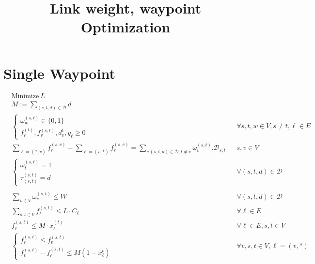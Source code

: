 \documentclass[a4paper,USenglish]{lipics-v2018}
\title{Link weight, waypoint Optimization}
\begin{document}
\maketitle

\section{Single Waypoint}

\begin{align}
& \text{Minimize} ~L \nonumber	&&\\
&M := \sum_{ (s,t,d) \in \mathcal{D}} d &&
\\
&\begin{cases}
\omega^{(s,t)}_{w} \in \{0,1\} \\
f^{(t)}_{\ell}, f^{(s,t)}_{v}, d^{t}_v, y_{\ell}  \geq 0
\end{cases}
&&\forall  s,t,w \in V, s \neq t, \ell \in E \label{LP:vardef}    
\\
&\sum_{\ell = (*,v)} f^{(s,v)}_{\ell} - 
	\sum_{\ell= (v,*)}f^{(s,v)}_{\ell}
	=  \sum_{ \forall (s,t,d) \in \mathcal{D}, t\neq v} \omega^{(s,t)}_{v}.\mathcal{D}_{s,t}
&& s,v \in V
\label{LP:flowcons}
\\
& 
\begin{cases}
\omega^{(s,t)}_{t} = 1 \\
\tau^{(s,t)}_{(s,t)} = d
\end{cases}
&& \forall (s,t,d) \in \mathcal{D}
\label{LP:wp_t}
\\
&
\\
&\sum_{v \in V}  \omega^{(s,t)}_v \leq W
&& \forall (s,t,d) \in \mathcal{D}
\label{LP:wp_limit} 
\\
& \sum_{ s,t \in V} f^{(s,t)}_{\ell} \leq L \cdot C_{\ell}
&& \forall \ell \in E
\\
&   f^{(s,t)}_{\ell} \leq M \cdot x^{(t)}_{\ell}
&& \forall \ell \in E, s,t \in V
\label{LP:SPTree} 
\\
&
\begin{cases*}
f^{(s,t)}_{\ell} \leq f^{(s,t)}_{v}	\\
f^{(s,t)}_{v} - f^{(s,t)}_{\ell} \leq M(1 - x^{t}_{\ell}) 
\end{cases*}	
&& \forall v,s,t \in V, \ell = (v,*)

\end{align}
\end{document}
